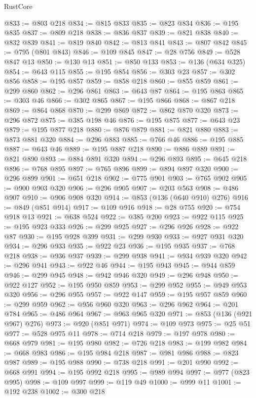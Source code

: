 \begin{lexlean}{RustCore}
\begin{coremodule}
@833 := @803 @218
@834 := @815 @833
@835 := @823 @834
@836 := @195 @835
@837 := @809 @218
@838 := @836 @837
@839 := @821 @838
@840 := @832 @839
@841 := @819 @840
@842 := @813 @841
@843 := @807 @842
@845 := @795 (@801 @843)
@846 := @109 @845
@847 := @28 @756
@849 := @528 @847 @13
@850 := @130 @13
@851 := @850 @133
@853 := @136 (@634 @325)
@854 := @643 @115
@855 := @195 @854
@856 := @303 @23
@857 := @302 @856
@858 := @195 @857
@859 := @858 @218
@860 := @855 @859
@861 := @299 @860
@862 := @296 @861
@863 := @643 @87
@864 := @195 @863
@865 := @303 @46
@866 := @302 @865
@867 := @195 @866
@868 := @867 @218
@869 := @864 @868
@870 := @299 @869
@872 := @862 @870 @320
@873 := @296 @872
@875 := @385 @198 @46
@876 := @195 @875
@877 := @643 @23
@879 := @195 @877 @218
@880 := @876 @879
@881 := @821 @880
@883 := @873 @881 @320
@884 := @296 @883
@885 := @766 @46
@886 := @195 @885
@887 := @643 @46
@889 := @195 @887 @218
@890 := @886 @889
@891 := @821 @890
@893 := @884 @891 @320
@894 := @296 @893
@895 := @645 @218
@896 := @768 @895
@897 := @765 @896
@899 := @894 @897 @320
@900 := @296 @899
@901 := @651 @218
@902 := @775 @901
@903 := @765 @902
@905 := @900 @903 @320
@906 := @296 @905
@907 := @203 @563
@908 := @486 @907
@910 := @906 @908 @320
@914 := @853 (@136 (@640 @910) @276)
@916 := @849 (@851 @914)
@917 := @109 @916
@918 := @28 @755
@920 := @754 @918 @13
@921 := @638 @524
@922 := @385 @200
@923 := @922 @115
@925 := @195 @923 @333
@926 := @299 @925
@927 := @296 @926
@928 := @922 @87
@930 := @195 @928 @399
@931 := @299 @930
@933 := @927 @931 @320
@934 := @296 @933
@935 := @922 @23
@936 := @195 @935
@937 := @768 @218
@938 := @936 @937
@939 := @299 @938
@941 := @934 @939 @320
@942 := @296 @941
@943 := @922 @46
@944 := @195 @943
@945 := @944 @859
@946 := @299 @945
@948 := @942 @946 @320
@949 := @296 @948
@950 := @922 @127
@952 := @195 @950 @859
@953 := @299 @952
@955 := @949 @953 @320
@956 := @296 @955
@957 := @922 @147
@959 := @195 @957 @859
@960 := @299 @959
@962 := @956 @960 @320
@963 := @296 @962
@964 := @201 @784
@965 := @486 @964
@967 := @963 @965 @320
@971 := @853 (@136 (@921 @967) @276)
@973 := @920 (@851 @971)
@974 := @109 @973
@975 := @25 @51
@977 := @528 @975 @11
@978 := @714 @218
@979 := @197 @978
@980 := @668 @979
@981 := @195 @980
@982 := @726 @218
@983 := @199 @982
@984 := @668 @983
@986 := @195 @984 @218
@987 := @981 @986
@988 := @823 @987
@989 := @195 @988
@990 := @738 @218
@991 := @201 @990
@992 := @668 @991
@994 := @195 @992 @218
@995 := @989 @994
@997 := @977 (@823 @995)
@998 := @109 @997
@999 := @119 @49
@1000 := @999 @11
@1001 := @192 @238
@1002 := @300 @218

\end{coremodule}
\end{lexlean}
